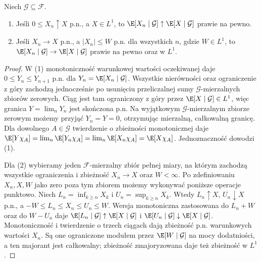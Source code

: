 \begin{twierdzenie}
Niech $\mathcal G\subseteq\mathcal F$.
\begin{enumerate}
\item Jeśli $0\leq X_n\uparrow X$ p.n., a $X\in L^1$,
to $\E[X_n\mid\mathcal G]\uparrow\E[X\mid\mathcal G]$
prawie na pewno.
\item Jeśli $X_n\to X$ p.n., a $|X_n|\leq W$
p.n. dla wszystkich $n$, gdzie $W\in L^1$, to
$\E[X_n\mid\mathcal G]\to\E[X\mid\mathcal G]$
prawie na pewno oraz w $L^1$.
\end{enumerate}
\end{twierdzenie}
\begin{proof}
W (1) monotoniczność warunkowej wartości oczekiwanej
daje $0\leq Y_n\leq Y_{n+1}$ p.n. dla
$Y_n=\E[X_n\mid\mathcal G]$. Wszystkie nierówności
oraz ograniczenie z góry zachodzą jednocześnie
po usunięciu przeliczalnej sumy $\mathcal G$-mierzalnych
zbiorów zerowych. Ciąg jest tam ograniczony z góry przez
$\E[X\mid\mathcal G]\in L^1$, więc granica
$Y=\lim_nY_n$ jest skończona p.n. Na wyjątkowym
$\mathcal G$-mierzalnym zbiorze zerowym możemy
przyjąć $Y_n=Y=0$, otrzymując mierzalną,
całkowalną granicę. Dla dowolnego
$A\in\mathcal G$ twierdzenie o zbieżności monotonicznej
daje
$\E[Y\chi_{A}]=\lim_n\E[Y_n\chi_{A}]
=\lim_n\E[X_n\chi_{A}]=\E[X\chi_{A}]$.
Jednoznaczność dowodzi (1).

Dla (2) wybieramy jeden $\mathcal F$-mierzalny
zbiór pełnej miary, na którym zachodzą wszystkie
ograniczenia i zbieżność $X_n\to X$ oraz $W<\infty$.
Po zdefiniowaniu $X_n,X,W$ jako zero poza tym zbiorem
możemy wykonywać poniższe operacje punktowo. Niech
$L_n=\inf_{k\geq n}X_k$ i
$U_n=\sup_{k\geq n}X_k$. Wtedy
$L_n\uparrow X$, $U_n\downarrow X$ p.n., a
$-W\leq L_n\leq X_n\leq U_n\leq W$.
Wersja monotoniczna zastosowana do $L_n+W$ oraz
do $W-U_n$ daje
$\E[L_n\mid\mathcal G]\uparrow\E[X\mid\mathcal G]$
i $\E[U_n\mid\mathcal G]\downarrow\E[X\mid\mathcal G]$.
Monotoniczność i twierdzenie o trzech ciągach
dają zbieżność p.n. warunkowych wartości $X_n$.
Są one ograniczone modułem przez $\E[W\mid\mathcal G]$
na mocy dodatniości, a ten majorant jest całkowalny;
zbieżność zmajoryzowana daje też zbieżność w $L^1$.
\end{proof}

